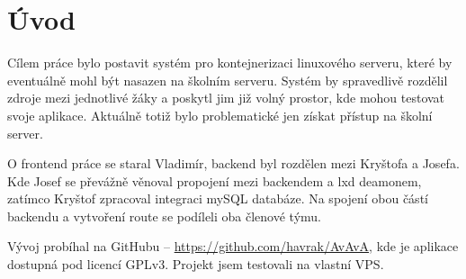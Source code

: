\chapter*{Úvod}

Cílem práce bylo postavit systém pro kontejnerizaci linuxového serveru, které by eventuálně mohl být nasazen na školním serveru.
Systém by spravedlivě rozdělil zdroje mezi jednotlivé žáky a poskytl jim již volný prostor, kde mohou testovat svoje aplikace.
Aktuálně totiž bylo problematické jen získat přístup na školní server.

O frontend práce se staral Vladimír, backend byl rozdělen mezi Kryštofa a Josefa.
Kde Josef se převážně věnoval propojení mezi backendem a lxd deamonem, zatímco Kryštof zpracoval integraci mySQL databáze.
Na spojení obou částí backendu a vytvoření route se podíleli oba členové týmu.

Vývoj probíhal na GitHubu -- \url{https://github.com/havrak/AvAvA}, kde je aplikace dostupná pod licencí GPLv3.
Projekt jsem testovali na vlastní VPS.


